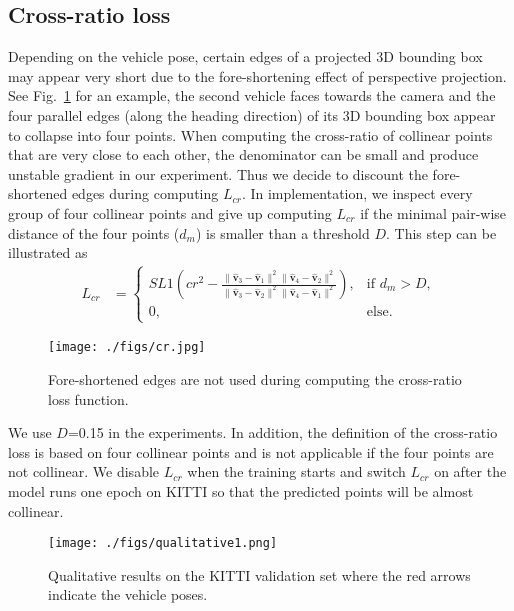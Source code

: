 \documentclass[final]{cvpr}
\begin{document}
\subsection{Cross-ratio loss}
Depending on the vehicle pose, certain edges of a projected 3D bounding box may appear very short due to the fore-shortening effect of perspective projection. See Fig.~\ref{fig:cr2} for an example, the second vehicle faces towards the camera and the four parallel edges (along the heading direction) of its 3D bounding box appear to collapse into four points. When computing the cross-ratio of collinear points that are very close to each other, the denominator can be small and produce unstable gradient in our experiment. Thus we decide to discount the fore-shortened edges during computing $L_{cr}$. In implementation, we inspect every group of four collinear points and give up computing $L_{cr}$ if the minimal pair-wise distance of the four points ($d_m$) is smaller than a threshold $D$. This step can be illustrated as
\begin{align*}
L_{cr} & = \begin{cases}
SL1(cr^2 - \frac{\|\hat{\mathbf{v}}_3 - \hat{\mathbf{v}}_1\|^2\|\hat{\mathbf{v}}_4 - \hat{\mathbf{v}}_2\|^2}
{\|\hat{\mathbf{v}}_3 - \hat{\mathbf{v}}_2\|^2\|\hat{\mathbf{v}}_4 - \hat{\mathbf{v}}_1\|^2}), &\mbox{if } d_m > D,\\
0, & \mbox{else}.
\end{cases}
\end{align*}
\begin{figure}[h]
	\begin{center}
		\texttt{[image: ./figs/cr.jpg]}
	\end{center}
	\caption{Fore-shortened edges are not used during computing the cross-ratio loss function.}
	\label{fig:cr2}
\end{figure}
We use $D$=0.15 in the experiments. In addition, the definition of the cross-ratio loss is based on four collinear points and is not applicable if the four points are not collinear. We disable $L_{cr}$ when the training starts and switch $L_{cr}$ on after the model runs one epoch on KITTI so that the predicted points will be almost collinear.

\begin{figure*}[t]
	\begin{center}
		\texttt{[image: ./figs/qualitative1.png]}
	\end{center}
	\caption{Qualitative results on the KITTI validation set where the red arrows indicate the vehicle poses.}
	\label{fig:qualitative_supp}
\end{figure*}
\end{document}
